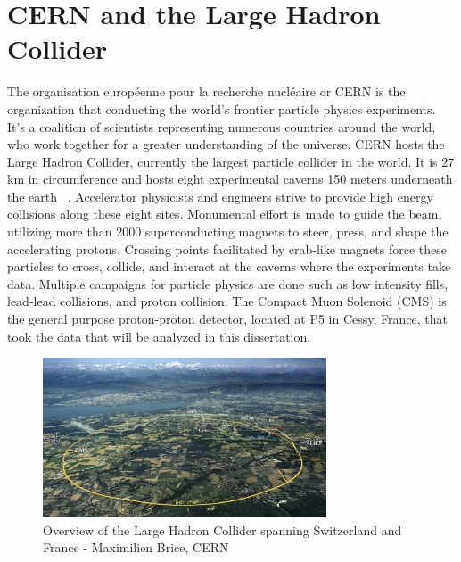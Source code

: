 \section{CERN and the Large Hadron Collider}
The organisation européenne pour la recherche nucléaire or CERN is the organization that conducting the world's frontier particle physics experiments. It's a coalition of scientists representing numerous countries around the world, who work together for a greater understanding of the universe. CERN hosts the Large Hadron Collider, currently the largest particle collider in the world. It is 27 km in circumference and hosts eight experimental caverns 150 meters underneath the earth ~\cite{}. Accelerator physicists and engineers strive to provide high energy collisions along these eight sites. Monumental effort is made to guide the beam, utilizing more than 2000 superconducting magnets to steer, press, and shape the accelerating protons. Crossing points facilitated by crab-like magnets force these particles to cross, collide, and interact at the caverns where the experiments take data. Multiple campaigns for particle physics are done such as low intensity fills, lead-lead collisions, and proton collision. The Compact Muon Solenoid (CMS) is the general purpose proton-proton detector, located at P5 in Cessy, France, that took the data that will be analyzed in this dissertation. 

\begin{figure}[ht!b]
  \centering
\includegraphics[width=0.75\textwidth]{figures/LHC_map-s.jpg}    
    \caption{\label{fig:lhc} Overview of the Large Hadron Collider spanning Switzerland and France - Maximilien Brice, CERN }
\end{figure}

